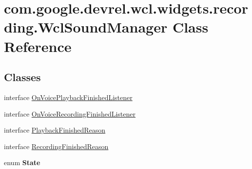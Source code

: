 \hypertarget{classcom_1_1google_1_1devrel_1_1wcl_1_1widgets_1_1recording_1_1WclSoundManager}{}\section{com.\+google.\+devrel.\+wcl.\+widgets.\+recording.\+Wcl\+Sound\+Manager Class Reference}
\label{classcom_1_1google_1_1devrel_1_1wcl_1_1widgets_1_1recording_1_1WclSoundManager}
\subsection*{Classes}
\begin{DoxyCompactItemize}
\item 
interface \hyperlink{interfacecom_1_1google_1_1devrel_1_1wcl_1_1widgets_1_1recording_1_1WclSoundManager_1_1OnVoicePlaybackFinishedListener}{On\+Voice\+Playback\+Finished\+Listener}
\item 
interface \hyperlink{interfacecom_1_1google_1_1devrel_1_1wcl_1_1widgets_1_1recording_1_1WclSoundManager_1_1OnVoiceRecordingFinishedListener}{On\+Voice\+Recording\+Finished\+Listener}
\item 
interface \hyperlink{interfacecom_1_1google_1_1devrel_1_1wcl_1_1widgets_1_1recording_1_1WclSoundManager_1_1PlaybackFinishedReason}{Playback\+Finished\+Reason}
\item 
interface \hyperlink{interfacecom_1_1google_1_1devrel_1_1wcl_1_1widgets_1_1recording_1_1WclSoundManager_1_1RecordingFinishedReason}{Recording\+Finished\+Reason}
\item 
enum {\bfseries State}
\end{DoxyCompactItemize}
